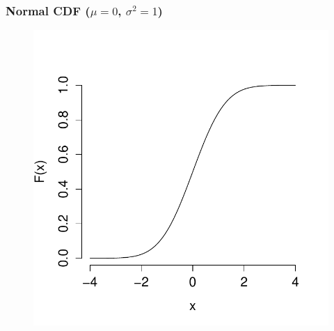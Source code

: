 \documentclass[handout]{beamer}
\begin{document}
\begin{frame}
\frametitle{Normal CDF ($\mu = 0$, $\sigma^2 = 1$)}

\begin{figure}
\includegraphics[scale = 0.62]{./images/std_normal_CDF}
\end{figure}
\end{frame}

\end{document}
